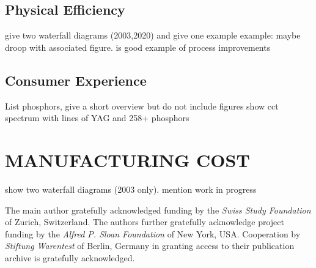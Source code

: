 \documentclass[a4paper]{spie}  %
\begin{document}
\subsection{Physical Efficiency}

give two waterfall diagrams (2003,2020) and give one example
example: maybe droop with associated figure. is good example of process improvements

\subsection{Consumer Experience}

List phosphors, give a short overview but do not include figures
show cct spectrum with lines of YAG and 258+ phosphors

\section{MANUFACTURING COST}

show two waterfall diagrams (2003 only). mention work in progress




\acknowledgments %
 
The main author gratefully acknowledged funding by the \textit{Swiss Study Foundation} of Zurich, Switzerland. The authors further gratefully acknowledge project funding by the \textit{Alfred P. Sloan Foundation} of New York, USA. Cooperation by \textit{Stiftung Warentest} of Berlin, Germany in granting access to their publication archive is gratefully acknowledged.

\end{document}
